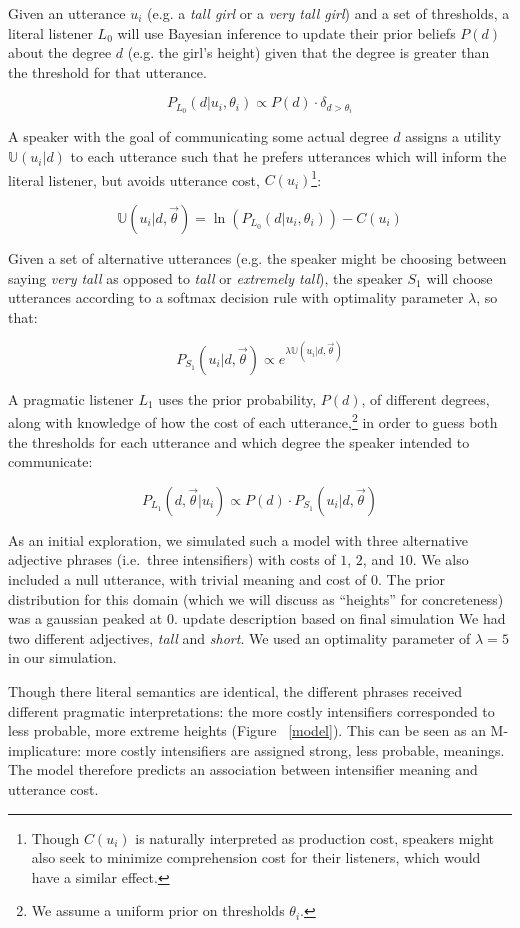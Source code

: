 \documentclass[10pt,letterpaper]{article}
\newcommand{\w}[1]{\emph{#1}}
\newcommand{\todo}[1]{{\color{red}#1}}
\begin{document}
Given an utterance $u_i$ (e.g. a \w{tall girl} or a \w{very tall girl}) and a set of thresholds, a literal listener $L_0$ will use Bayesian inference to update their prior beliefs $P(d)$ about the degree $d$ (e.g. the girl's height) given that the degree is greater than the threshold for that utterance.

$$P_{L_0}(d|u_i, \theta_i) \propto P(d) \cdot \delta_{d > \theta_i}$$

A speaker with the goal of communicating some actual degree $d$ assigns a utility $\mathbb{U}(u_i|d)$ to each utterance such that he prefers utterances which will inform the literal listener, but avoids utterance cost, $C(u_i)$\footnote{Though $C(u_{i})$ is naturally interpreted as production cost, speakers might also seek to minimize comprehension cost for their listeners, which would have a similar effect.}:

$$\mathbb{U}(u_i | d, \vec{\theta}) =  \ln\left(P_{L_0}(d | u_i, \theta_i) \right) - C(u_i) $$

Given a set of alternative utterances (e.g. the speaker might be choosing between saying \w{very tall} as opposed to \w{tall} or \w{extremely tall}), the speaker $S_1$ will choose utterances according to a softmax decision rule \cite{sutton} with optimality parameter $\lambda$, so that:

$$ P_{S_1}(u_i | d, \vec{\theta}) \propto e^{\lambda \mathbb{U}(u_i | d, \vec{\theta})} $$

A pragmatic listener $L_1$ uses the prior probability, $P(d)$, of different degrees, along with knowledge of how the cost of each utterance,\footnote{We assume a uniform prior on thresholds $\theta_i$.} in order to guess both the thresholds for each utterance and which degree the speaker intended to communicate:

$$ P_{L_1}(d, \vec{\theta} | u_i) \propto P(d) \cdot P_{S_1}(u_i | d, \vec{\theta}) $$

As an initial exploration, we simulated such a model with three alternative adjective phrases (i.e.~three intensifiers) with costs of $1$, $2$, and $10$. We also included a null utterance, with trivial meaning and cost of $0$. The prior distribution for this domain (which we will discuss as ``heights'' for concreteness) was a gaussian peaked at $0$.
\todo{update description based on final simulation}
We had two different adjectives, \w{tall} and \w{short}. We used an optimality parameter of $\lambda=5$ in our simulation. 

Though there literal semantics are identical, the different phrases received different pragmatic interpretations: the more costly intensifiers corresponded to less probable, more extreme heights (Figure ~\ref{model}). This can be seen as an M-implicature: more costly intensifiers are assigned strong, less probable, meanings. 
The model therefore predicts an association between intensifier meaning and utterance cost.
\end{document}
